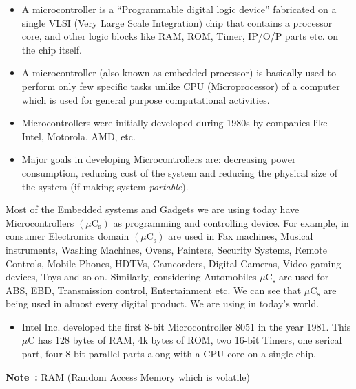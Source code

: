 \medskip
{}
\begin{itemize}
\item A microcontroller is a ``Programmable digital logic device'' fabricated on a single VLSI (Very Large Scale Integration) chip that contains a processor core, and other logic blocks like RAM, ROM, Timer, IP/O/P parts etc. on the chip itself.

\item A microcontroller (also known as embedded processor) is basically used to perform only few specific tasks unlike CPU (Microprocessor) of a computer which is used for general purpose computational activities. 

\item Microcontrollers were initially developed during 1980s by companies like Intel, Motorola, AMD, etc.

\item Major goals in developing Microcontrollers are: decreasing power consumption, reducing cost of the system and reducing the physical size of the system (if making system {\em portable}).
\end{itemize}

\medskip
{}
\medskip

Most of the Embedded systems and Gadgets we are using today have Microcontrollers $(\mu \text{C}_{\text{s}})$ as programming and controlling device. For example, in consumer Electronics domain $(\mu \text{C}_{\text{s}})$ are used in Fax machines, Musical instruments, Washing Machines, Ovens, Painters, Security Systems, Remote Controls, Mobile Phones, HDTVs, Camcorders, Digital Cameras, Video gaming devices, Toys and so on. Similarly, considering Automobiles $\mu \text{C}_{\text{s}}$ are used for ABS, EBD, Transmission control, Entertainment etc. We can see that $\mu \text{C}_{\text{s}}$ are being used in almost every digital product. We are using in today's world.

\medskip
{}
\begin{itemize}
\item Intel Inc. developed the first 8-bit Microcontroller 8051 in the year 1981. This $\mu \text{C}$ has 128 bytes of RAM, 4k bytes of ROM, two 16-bit Timers, one serical part, four 8-bit parallel parts along with a CPU core on a single chip.
\end{itemize}

\noindent
{\bf Note~:} RAM (Random Access Memory which is volatile) 

